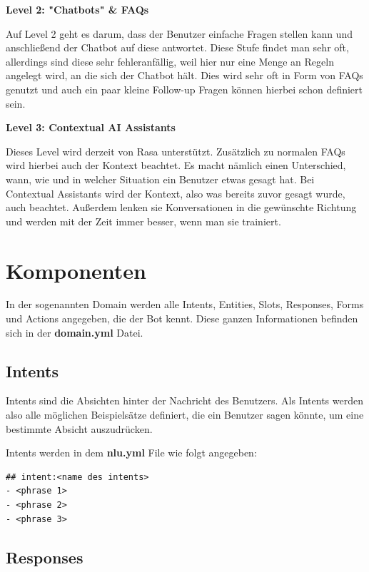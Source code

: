 \textbf{Level 2: "Chatbots" \& FAQs}

Auf Level 2 geht es darum, dass der Benutzer einfache Fragen stellen kann und anschließend der Chatbot auf diese antwortet.
Diese Stufe findet man sehr oft, allerdings sind diese sehr fehleranfällig, weil hier nur eine Menge an Regeln angelegt wird, an die sich der Chatbot hält.
Dies wird sehr oft in Form von FAQs genutzt und auch ein paar kleine Follow-up Fragen können hierbei schon definiert sein.\cite{rasaMasterclass5Levels,ai5Levels,ai5LevelsVideo}

\textbf{Level 3: Contextual AI Assistants}

Dieses Level wird derzeit von Rasa unterstützt.
Zusätzlich zu normalen FAQs wird hierbei auch der Kontext beachtet.
Es macht nämlich einen Unterschied, wann, wie und in welcher Situation ein Benutzer etwas gesagt hat.
Bei Contextual Assistants wird der Kontext, also was bereits zuvor gesagt wurde, auch beachtet.
Außerdem lenken sie Konversationen in die gewünschte Richtung und werden mit der Zeit immer besser, wenn man sie trainiert.\cite{rasaMasterclass5Levels,ai5Levels,ai5LevelsVideo}

\section{Komponenten}

In der sogenannten Domain werden alle Intents, Entities, Slots, Responses, Forms und Actions angegeben, die der Bot kennt.
Diese ganzen Informationen befinden sich in der \textbf{domain.yml} Datei.\cite{domain}

\subsection{Intents}

Intents sind die Absichten hinter der Nachricht des Benutzers.
Als Intents werden also alle möglichen Beispielsätze definiert, die ein Benutzer sagen könnte, um eine bestimmte Absicht auszudrücken.\cite{intents}

Intents werden in dem \textbf{nlu.yml} File wie folgt angegeben:

\begin{lstlisting}[label={lst: Intent Example}]
## intent:<name des intents>
- <phrase 1>
- <phrase 2>
- <phrase 3>
\end{lstlisting}

\subsection{Responses}

